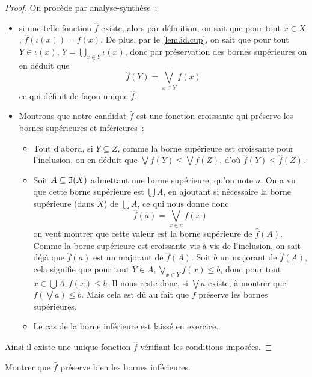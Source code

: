 \begin{proof}
  On procède par analyse-synthèse~:
  \begin{itemize}
  \item si une telle fonction $\hat f$ existe, alors par définition, on sait
    que pour tout $x\in X$, $\hat f(\iota(x)) = f(x)$. De plus, par le
    \cref{lem.id.cup}, on sait que pour tout $Y\in \iota(x)$,
    $\displaystyle Y = \bigcup_{x\in Y} \iota(x)$, donc par préservation des
    bornes supérieures on en déduit que
    \[\hat f(Y) = \bigvee_{x\in Y} f(x)\]
    ce qui définit de façon unique $\hat f$.
  \item Montrons que notre candidat $\hat f$ est une fonction croissante qui
    préserve les bornes supérieures et inférieures~:
    \begin{itemize}
    \item Tout d'abord, si
      $Y\subseteq Z$, comme la borne supérieure est croissante pour l'inclusion,
      on en déduit que $\bigvee f(Y) \leq \bigvee f(Z)$, d'où
      $\hat f(Y)\leq \hat f(Z)$.
      
    \item Soit $A\subseteq \mathfrak{I}(X)$ admettant une borne supérieure, qu'on note
      $a$. On a vu que cette borne supérieure est $\bigcup A$, en ajoutant si
      nécessaire la borne supérieure (dans $X$) de $\bigcup A$, ce qui nous
      donne donc
      \[\hat f(a) = \bigvee_{x \in a} f(x)\]
      on veut montrer que cette valeur est la borne supérieure de $\hat f(A)$.
      Comme la borne supérieure est croissante vis à vis de l'inclusion, on sait
      déjà que $\hat f(a)$ est un majorant de $\hat f(A)$.
      Soit $b$ un majorant de $\hat f(A)$, cela signifie que pour tout
      $Y\in A, \bigvee_{x \in Y} f(x) \leq b$, donc pour tout
      $x \in \bigcup A, f(x) \leq b$. Il nous reste donc, si $\bigvee a$ existe,
      à montrer que $f(\bigvee a) \leq b$. Mais cela est dû au fait que $f$
      préserve les bornes supérieures.
    \item Le cas de la borne inférieure est laissé en exercice.
    \end{itemize}
  \end{itemize}
  Ainsi il existe une unique fonction $\hat f$ vérifiant les conditions
  imposées.
\end{proof}

\begin{exercise}
  Montrer que $\hat f$ préserve bien les bornes inférieures.
\end{exercise}

